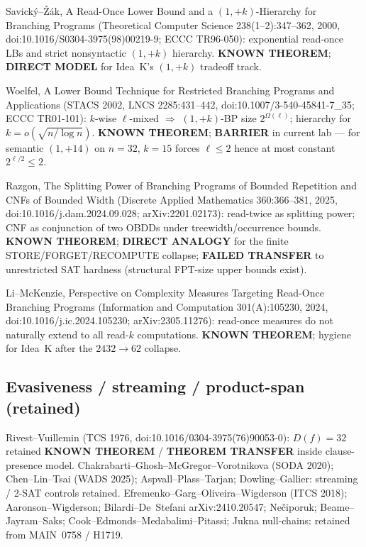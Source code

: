 \documentclass[11pt]{article}
\begin{document}
Savick\'y--\v{Z}\'ak, A Read-Once Lower Bound and a $(1,+k)$-Hierarchy for Branching Programs
(Theoretical Computer Science 238(1--2):347--362, 2000, doi:10.1016/S0304-3975(98)00219-9;
ECCC TR96-050): exponential read-once LBs and strict nonsyntactic $(1,+k)$ hierarchy.
\textbf{KNOWN THEOREM}; \textbf{DIRECT MODEL} for Idea~K's $(1,+k)$ tradeoff track.

Woelfel, A Lower Bound Technique for Restricted Branching Programs and Applications
(STACS 2002, LNCS 2285:431--442, doi:10.1007/3-540-45841-7\_35; ECCC TR01-101):
$k$-wise $\ell$-mixed $\Rightarrow$ $(1,+k)$-BP size $2^{\Omega(\ell)}$; hierarchy for
$k=o(\sqrt{n/\log n})$.
\textbf{KNOWN THEOREM}; \textbf{BARRIER} in current lab --- for semantic $(1,+14)$ on $n=32$,
$k=15$ forces $\ell\le2$ hence at most constant $2^{\ell/2}\le2$.

Razgon, The Splitting Power of Branching Programs of Bounded Repetition and CNFs of Bounded Width
(Discrete Applied Mathematics 360:366--381, 2025, doi:10.1016/j.dam.2024.09.028; arXiv:2201.02173):
read-twice as splitting power; CNF as conjunction of two OBDDs under treewidth/occurrence bounds.
\textbf{KNOWN THEOREM}; \textbf{DIRECT ANALOGY} for the finite STORE/FORGET/RECOMPUTE collapse;
\textbf{FAILED TRANSFER} to unrestricted SAT hardness (structural FPT-size upper bounds exist).

Li--McKenzie, Perspective on Complexity Measures Targeting Read-Once Branching Programs
(Information and Computation 301(A):105230, 2024, doi:10.1016/j.ic.2024.105230; arXiv:2305.11276):
read-once measures do not naturally extend to all read-$k$ computations.
\textbf{KNOWN THEOREM}; hygiene for Idea~K after the $2432\to62$ collapse.

\subsection*{Evasiveness / streaming / product-span (retained)}
Rivest--Vuillemin (TCS 1976, doi:10.1016/0304-3975(76)90053-0): $D(f)=32$ retained
\textbf{KNOWN THEOREM} / \textbf{THEOREM TRANSFER} inside clause-presence model.
Chakrabarti--Ghosh--McGregor--Vorotnikova (SODA 2020); Chen--Lin--Tsai (WADS 2025);
Aspvall--Plass--Tarjan; Dowling--Gallier: streaming / 2-SAT controls retained.
Efremenko--Garg--Oliveira--Wigderson (ITCS 2018); Aaronson--Wigderson; Bilardi--De~Stefani
arXiv:2410.20547; Ne\v{c}iporuk; Beame--Jayram--Saks; Cook--Edmonds--Medabalimi--Pitassi;
Jukna null-chains: retained from MAIN~0758 / H1719.
\end{document}
